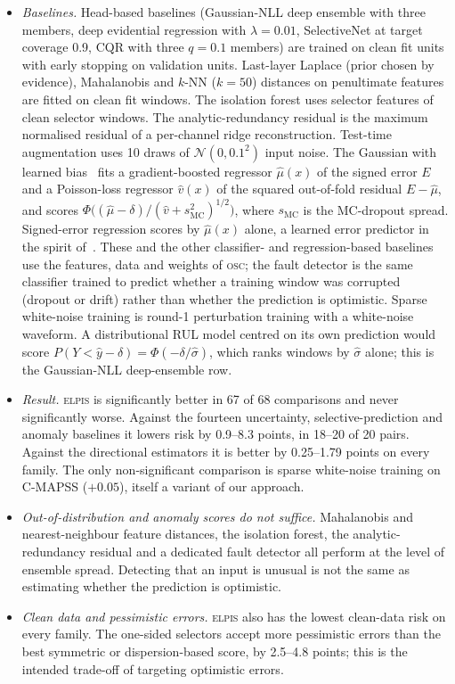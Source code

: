 \documentclass{esannV2}
\newcommand{\OSC}{\textsc{osc}}
\newcommand{\RPT}{\textsc{elpis}}
\begin{document}
\begin{itemize}
\item \emph{Baselines.} Head-based baselines (Gaussian-NLL deep ensemble with three members, deep evidential regression with $\lambda=0.01$, SelectiveNet at target coverage 0.9, CQR with three $q=0.1$ members) are trained on clean fit units with early stopping on validation units. Last-layer Laplace (prior chosen by evidence), Mahalanobis and $k$-NN ($k{=}50$) distances on penultimate features are fitted on clean fit windows. The isolation forest uses selector features of clean selector windows. The analytic-redundancy residual is the maximum normalised residual of a per-channel ridge reconstruction. Test-time augmentation uses 10 draws of $\mathcal N(0,0.1^2)$ input noise. The Gaussian with learned bias~\cite{nix1994estimating} fits a gradient-boosted regressor $\hat\mu(x)$ of the signed error $E$ and a Poisson-loss regressor $\hat v(x)$ of the squared out-of-fold residual $E-\hat\mu$, and scores $\Phi\big((\hat\mu-\delta)/(\hat v+s^2_{\text{MC}})^{1/2}\big)$, where $s_{\text{MC}}$ is the MC-dropout spread. Signed-error regression scores by $\hat\mu(x)$ alone, a learned error predictor in the spirit of~\cite{yoo2019learning}. These and the other classifier- and regression-based baselines use the features, data and weights of \OSC; the fault detector is the same classifier trained to predict whether a training window was corrupted (dropout or drift) rather than whether the prediction is optimistic. Sparse white-noise training is round-1 perturbation training with a white-noise waveform. A distributional RUL model centred on its own prediction would score $P(Y<\hat y-\delta)=\Phi(-\delta/\hat\sigma)$, which ranks windows by $\hat\sigma$ alone; this is the Gaussian-NLL deep-ensemble row.
\item \emph{Result.} \RPT{} is significantly better in 67 of 68 comparisons and never significantly worse. Against the fourteen uncertainty, selective-prediction and anomaly baselines it lowers risk by 0.9--8.3 points, in 18--20 of 20 pairs. Against the directional estimators it is better by 0.25--1.79 points on every family. The only non-significant comparison is sparse white-noise training on C-MAPSS ($+0.05$), itself a variant of our approach.
\item \emph{Out-of-distribution and anomaly scores do not suffice.} Mahalanobis and nearest-neighbour feature distances, the isolation forest, the analytic-redundancy residual and a dedicated fault detector all perform at the level of ensemble spread. Detecting that an input is unusual is not the same as estimating whether the prediction is optimistic.
\item \emph{Clean data and pessimistic errors.} \RPT{} also has the lowest clean-data risk on every family. The one-sided selectors accept more pessimistic errors than the best symmetric or dispersion-based score, by 2.5--4.8 points; this is the intended trade-off of targeting optimistic errors.
\end{itemize}
\end{document}
